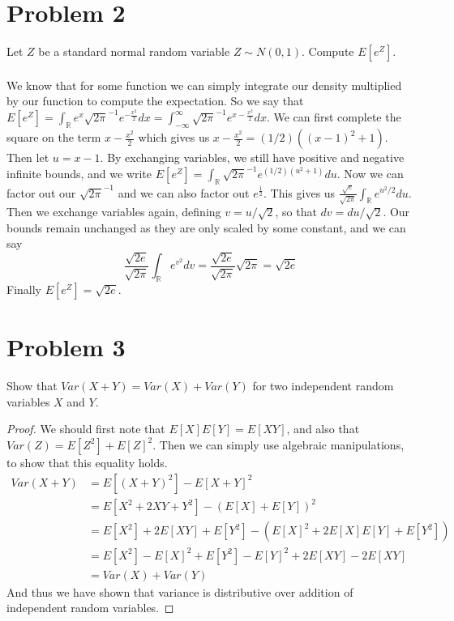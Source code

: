\documentclass{article}
\begin{document}
\section*{Problem 2}
    Let $Z$ be a standard normal random variable $Z \sim N(0,1)$. Compute $E[e^Z]$.\\\\
        We know that for some function we can simply integrate our density multiplied by our function to compute the expectation. So we say that 
        $E[e^Z] = \int_\mathbb{R} e^x \sqrt{2 \pi}^{-1} e^{-\frac{x^2}{2}} dx = \int_{-\infty}^\infty \sqrt{2 \pi}^{-1} e^{x - \frac{x^2}{2}}dx$.
        We can first complete the square on the term $x - \frac{x^2}{2}$ which gives us $x - \frac{x^2}{2} = (1 / 2)((x-1)^2 + 1)$. Then let $u = x-1$.
        By exchanging variables, we still have positive and negative infinite bounds, and we write $E[e^Z] = \int_\mathbb{R} \sqrt{2 \pi}^{-1} e^{(1 / 2)(u^2 + 1)} du$.
        Now we can factor out our $\sqrt{2 \pi}^{-1}$ and we can also factor out $e^{\frac{1}{2}}$. This gives us $\frac{\sqrt{e}}{\sqrt{2 \pi}} \int_\mathbb{R} e^{u^2 / 2} du$.
        Then we exchange variables again, defining $v = u / \sqrt{2}$, so that $dv = du / \sqrt{2}$. Our bounds remain unchanged as they are only scaled by some constant, 
        and we can say 
        \[
            \frac{\sqrt{2e}}{\sqrt{2\pi}} \int_\mathbb{R} e^{v^2} dv = \frac{\sqrt{2e}}{\sqrt{2\pi}} \sqrt{2\pi} = \sqrt{2e}
        \]
        Finally $E[e^Z] = \sqrt{2e}$.
\section*{Problem 3}
    Show that $Var(X + Y) = Var(X) + Var(Y)$ for two independent random variables $X$ and $Y$.
    \begin{proof}
        We should first note that $E[X]E[Y] = E[XY]$, and also that $Var(Z) = E[Z^2] + E[Z]^2$. Then we can simply use algebraic manipulations, to show that 
        this equality holds.
        \begin{align*}
            Var(X + Y) & = E[(X+Y)^2] - E[X+Y]^2\\
            &= E[X^2 + 2XY + Y^2] - (E[X] + E[Y])^2 \\
            &= E[X^2] + 2E[XY] + E[Y^2] - (E[X]^2 + 2E[X]E[Y] + E[Y^2])\\
            &= E[X^2] - E[X]^2 + E[Y^2] - E[Y]^2 + 2E[XY] - 2E[XY] \\
            &= Var(X) + Var(Y)
        \end{align*}
        And thus we have shown that variance is distributive over addition of independent random variables.
    \end{proof}
\end{document}
